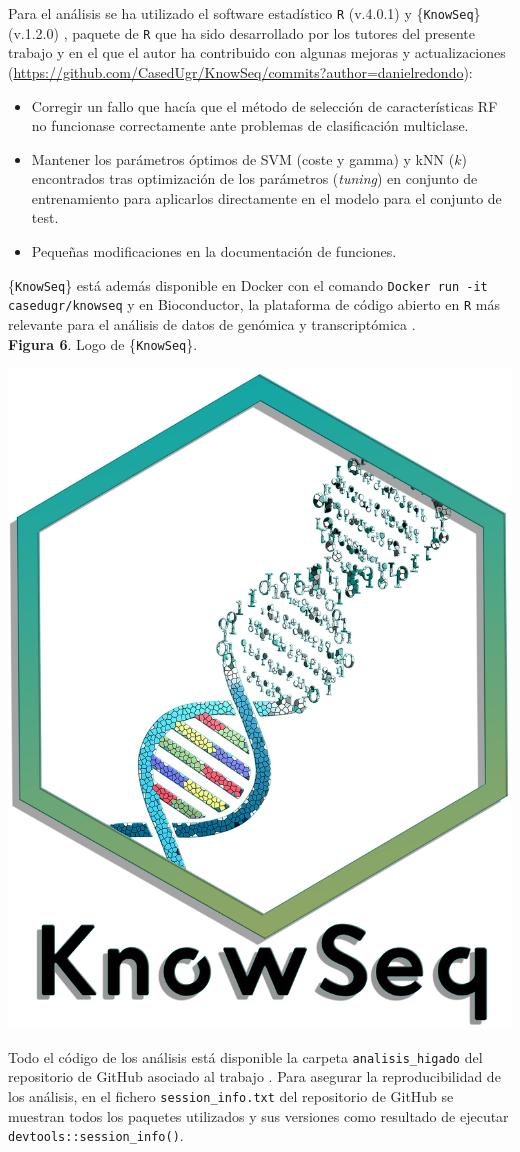 Para el análisis se ha utilizado el software estadístico \texttt{R} (v.4.0.1) \cite{R} y \{\texttt{KnowSeq}\} (v.1.2.0) \cite{KnowSeq}, paquete de \texttt{R} que ha sido desarrollado por los tutores del presente trabajo y en el que el autor ha contribuido con algunas mejoras y actualizaciones (\url{https://github.com/CasedUgr/KnowSeq/commits?author=danielredondo}):

\begin{itemize}
	\item Corregir un fallo que hacía que el método de selección de características RF no funcionase correctamente ante problemas de clasificación multiclase.
	\item Mantener los parámetros óptimos de SVM (coste y gamma) y kNN ($k$) encontrados tras optimización de los parámetros (\textit{tuning}) en conjunto de entrenamiento para aplicarlos directamente en el modelo para el conjunto de test.
	\item Pequeñas modificaciones en la documentación de funciones.
\end{itemize}

\{\texttt{KnowSeq}\} está además disponible en Docker con el comando \texttt{Docker run -it casedugr/knowseq} y en Bioconductor, la plataforma de código abierto en \texttt{R} más relevante para el análisis de datos de genómica y transcriptómica \cite{Gentleman2004}.\\

\textbf{Figura 6}. Logo de \{\texttt{KnowSeq}\}.
\begin{center}
	\includegraphics[width=.4\textwidth]{figuras/06_logo_knowseq.png} \\
\end{center}

Todo el código de los análisis está disponible la carpeta \texttt{analisis\_higado} del repositorio de GitHub asociado al trabajo \cite{Redondo-Sanchez2020}. Para asegurar la reproducibilidad de los análisis, en el fichero \texttt{session\_info.txt} del repositorio de GitHub \cite{Redondo-Sanchez2020} se muestran todos los paquetes utilizados y sus versiones como resultado de ejecutar \texttt{devtools::session\_info()}.\\

